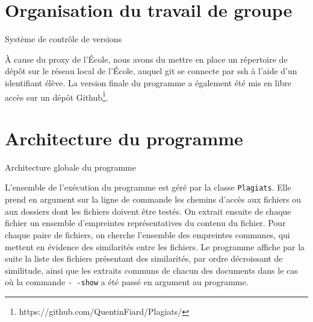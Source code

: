 \documentclass[a4paper,twoside,12pt]{article}
\newcounter{partie}
\newcounter{sous-partie}
\newenvironment{partie}[1]
{
\section{#1}
}
{

}
\newenvironment{sous-partie}[1]
{
\subsection{#1}
}
{

}
\begin{document}
\begin{partie}{Organisation du travail de groupe}
\begin{sous-partie}{Système de contrôle de versions}
\begin{paragraph}{}
À cause du proxy de l'École, nous avons du mettre en place un répertoire de dépôt sur le réseau local de l'École, auquel git se connecte par ssh à l'aide d'un identifiant élève. La version finale du programme a également été mis en libre accès sur un dépôt Github\footnote{https://github.com/QuentinFiard/Plagiats/}.
\end{paragraph}

\end{sous-partie}

\end{partie}

\clearpage

\begin{partie}{Architecture du programme}
\label{architecture}

\begin{sous-partie}{Architecture globale du programme}
\begin{paragraph}{}
L'ensemble de l'exécution du programme est géré par la classe \texttt{Plagiats}. Elle prend en argument sur la ligne de commande les chemins d'accès aux fichiers ou aux dossiers dont les fichiers doivent être testés. On extrait ensuite de chaque fichier un ensemble d'empreintes représentatives du contenu du fichier. Pour chaque paire de fichiers, on cherche l'ensemble des empreintes communes, qui mettent en évidence des similarités entre les fichiers. Le programme affiche par la suite la liste des fichiers présentant des similarités, par ordre décroissant de similitude, ainsi que les extraits communs de chacun des documents dans le cas où la commande \texttt{-\,\!-show} a été passé en argument au programme.
\end{paragraph}
\end{sous-partie}
\vspace{-0.2cm}


\end{partie}
\end{document}
